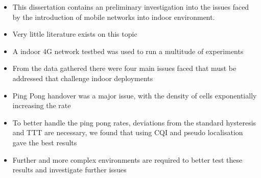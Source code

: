 \begin{itemize}
    \item This dissertation contains an preliminary investigation into the issues faced by the introduction of mobile networks into indoor environment.
    \item Very little literature exists on this topic
    \item A indoor 4G network testbed was used to run a multitude of experiments
    \item From the data gathered there were four main issues faced that must be addressed that challenge indoor deployments
    \item  Ping Pong handover was a major issue, with the density of cells exponentially increasing the rate
    \item To better handle the ping pong rates, deviations from the standard hysteresis and TTT are necessary, we found that using CQI and pseudo localisation gave the best results
    \item Further and more complex environments are required to better test these results and investigate further issues
\end{itemize}